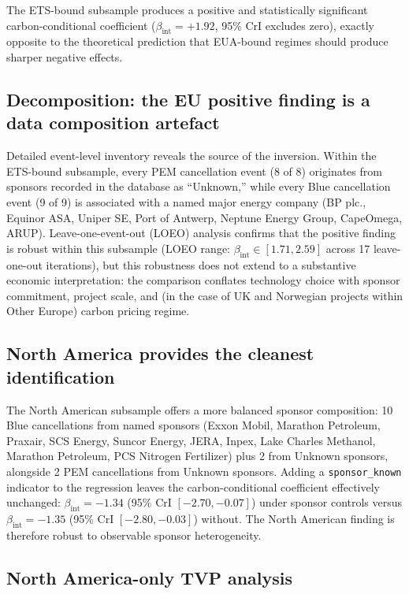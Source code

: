 \documentclass[11pt,a4paper]{article}
\newcommand{\bint}{\beta_{\mathrm{int}}}
\begin{document}
The ETS-bound subsample produces a positive and statistically significant carbon-conditional coefficient ($\bint = +1.92$, 95\% CrI excludes zero), exactly opposite to the theoretical prediction that EUA-bound regimes should produce sharper negative effects.

\subsection{Decomposition: the EU positive finding is a data composition artefact}

Detailed event-level inventory reveals the source of the inversion. Within the ETS-bound subsample, every PEM cancellation event (8 of 8) originates from sponsors recorded in the database as ``Unknown,'' while every Blue cancellation event (9 of 9) is associated with a named major energy company (BP plc., Equinor ASA, Uniper SE, Port of Antwerp, Neptune Energy Group, CapeOmega, ARUP). Leave-one-event-out (LOEO) analysis confirms that the positive finding is robust within this subsample (LOEO range: $\bint \in [1.71, 2.59]$ across 17 leave-one-out iterations), but this robustness does not extend to a substantive economic interpretation: the comparison conflates technology choice with sponsor commitment, project scale, and (in the case of UK and Norwegian projects within Other Europe) carbon pricing regime.

\subsection{North America provides the cleanest identification}

The North American subsample offers a more balanced sponsor composition: 10 Blue cancellations from named sponsors (Exxon Mobil, Marathon Petroleum, Praxair, SCS Energy, Suncor Energy, JERA, Inpex, Lake Charles Methanol, Marathon Petroleum, PCS Nitrogen Fertilizer) plus 2 from Unknown sponsors, alongside 2 PEM cancellations from Unknown sponsors. Adding a \texttt{sponsor\_known} indicator to the regression leaves the carbon-conditional coefficient effectively unchanged: $\bint = -1.34$ (95\% CrI $[-2.70, -0.07]$) under sponsor controls versus $\bint = -1.35$ (95\% CrI $[-2.80, -0.03]$) without. The North American finding is therefore robust to observable sponsor heterogeneity.

\subsection{North America-only TVP analysis}
\end{document}
